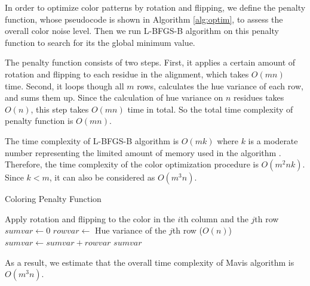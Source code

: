 In order to optimize color patterns by rotation and flipping, we define the penalty function, whose pseudocode is shown in Algorithm \ref{alg:optim}, to assess the overall color noise level. Then we run L-BFGS-B algorithm on this penalty function to search for its the global minimum value. 

The penalty function consists of two steps. First, it applies a certain amount of rotation and flipping to each residue in the alignment, which takes $O(mn)$ time. Second, it loops though all $m$ rows, calculates the hue variance of each row, and sums them up. Since the calculation of hue variance on $n$ residues takes $O(n)$, this step takes $O(mn)$ time in total. So the total time complexity of penalty function is $O(mn)$.

The time complexity of L-BFGS-B algorithm is $O(mk)$ where $k$ is a moderate number representing the limited amount of memory used in the algorithm \cite{Byrd:1995aa}. Therefore, the time complexity of the color optimization procedure is $O(m^2nk)$. Since $k<m$, it can also be considered as $O(m^3n)$.

\begin{algorithm}
\caption{Coloring Penalty Function}
\label{alg:optim}
\begin{algorithmic}
      \STATE Apply rotation and flipping to the color in the $i$th column and the $j$th row
    \ENDFOR
  \ENDFOR
  \STATE $sumvar \gets 0$
    \STATE $rowvar \gets$ Hue variance of the $j$th row ($O(n)$)
    \STATE $sumvar \gets sumvar + rowvar$
  \ENDFOR
  \RETURN $sumvar$
\end{algorithmic}
\end{algorithm}

As a result, we estimate that the overall time complexity of Mavis algorithm is $O(m^3n)$.
